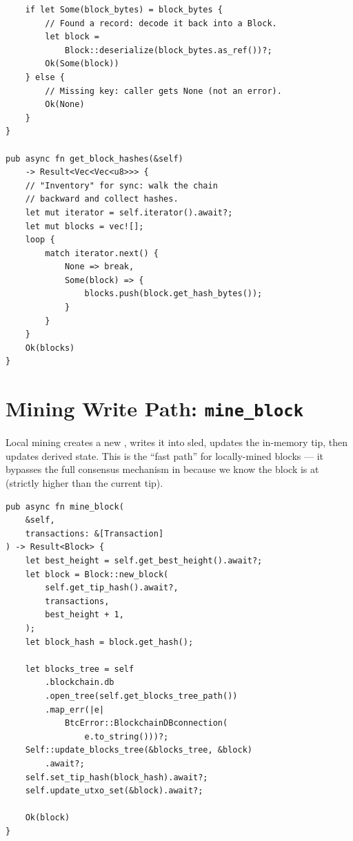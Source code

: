 \begin{listing}[htbp]
\begin{verbatim}
    if let Some(block_bytes) = block_bytes {
        // Found a record: decode it back into a Block.
        let block =
            Block::deserialize(block_bytes.as_ref())?;
        Ok(Some(block))
    } else {
        // Missing key: caller gets None (not an error).
        Ok(None)
    }
}

pub async fn get_block_hashes(&self)
    -> Result<Vec<Vec<u8>>> {
    // "Inventory" for sync: walk the chain
    // backward and collect hashes.
    let mut iterator = self.iterator().await?;
    let mut blocks = vec![];
    loop {
        match iterator.next() {
            None => break,
            Some(block) => {
                blocks.push(block.get_hash_bytes());
            }
        }
    }
    Ok(blocks)
}
\end{verbatim}
\end{listing}

\section{Mining Write Path: \texttt{mine\_block}}
\label{sec:ch11-mining-write}

Local mining creates a new , writes it into sled, updates the in-memory tip, then updates derived state. This is the ``fast path'' for locally-mined blocks --- it bypasses the full consensus mechanism in  because we know the block is at  (strictly higher than the current tip).

\begin{listing}[htbp]
\caption{Mining write path}
\label{lst:ch11-mine}
\begin{verbatim}
pub async fn mine_block(
    &self,
    transactions: &[Transaction]
) -> Result<Block> {
    let best_height = self.get_best_height().await?;
    let block = Block::new_block(
        self.get_tip_hash().await?,
        transactions,
        best_height + 1,
    );
    let block_hash = block.get_hash();

    let blocks_tree = self
        .blockchain.db
        .open_tree(self.get_blocks_tree_path())
        .map_err(|e|
            BtcError::BlockchainDBconnection(
                e.to_string()))?;
    Self::update_blocks_tree(&blocks_tree, &block)
        .await?;
    self.set_tip_hash(block_hash).await?;
    self.update_utxo_set(&block).await?;

    Ok(block)
}
\end{verbatim}
\end{listing}

